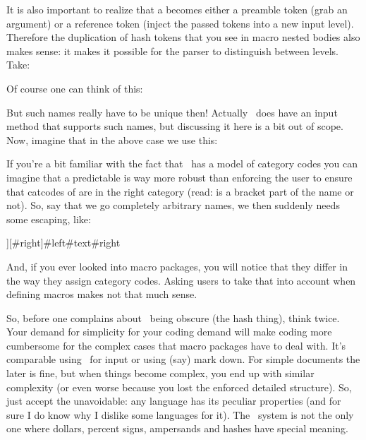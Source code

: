 It is also important to realize that a \type {#} becomes either a preamble token
(grab an argument) or a reference token (inject the passed tokens into a new
input level). Therefore the duplication of hash tokens \type {##} that you see in
macro nested bodies also makes sense: it makes it possible for the parser to
distinguish between levels. Take:

\starttyping[option=TEX]
\stoptyping

Of course one can think of this:

\starttyping[option=TEX]
\stoptyping

But such names really have to be unique then! Actually \CONTEXT\ does have an
input method that supports such names, but discussing it here is a bit out of
scope. Now, imagine that in the above case we use this:

\starttyping[option=TEX]
\stoptyping

If you're a bit familiar with the fact that \TEX\ has a model of category codes
you can imagine that a predictable  is way
more robust than enforcing the user to ensure that catcodes of  are
in the right category (read: is a bracket part of the name or not). So, say that
we go completely arbitrary names, we then suddenly needs some escaping, like:

\starttyping[option=TEX]
\def\foo[#{left}][#{right}]{\def\oof#{text}{#{left}#{text}#{right}}}
\stoptyping

And, if you ever looked into macro packages, you will notice that they differ in
the way they assign category codes. Asking users to take that into account when
defining macros makes not that much sense.

So, before one complains about \TEX\ being obscure (the hash thing), think twice.
Your demand for simplicity for your coding demand will make coding more
cumbersome for the complex cases that macro packages have to deal with. It's
comparable using \TEX\ for input or using (say) mark down. For simple documents
the later is fine, but when things become complex, you end up with similar
complexity (or even worse because you lost the enforced detailed structure). So,
just accept the unavoidable: any language has its peculiar properties (and for
sure I do know why I dislike some languages for it). The \TEX\ system is not the
only one where dollars, percent signs, ampersands and hashes have special
meaning.

